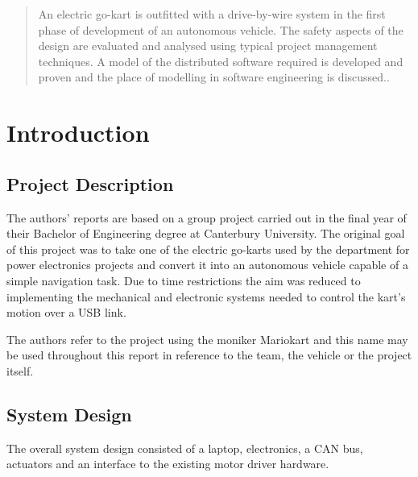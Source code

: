 
\begin{abstract}
An electric go-kart is outfitted with a drive-by-wire system in the first phase of development of 
an autonomous vehicle. The safety aspects of the design are evaluated and analysed  
using typical project management techniques. A model of the distributed software required is 
developed and proven and the place of modelling in software engineering is discussed..
\end{abstract}

\section{Introduction}

\subsection{Project Description}

The authors' reports are based on a group project carried out in the final year 
of their Bachelor of Engineering degree at Canterbury University. The original goal 
of this project was to take one of the electric go-karts used by the department for
power electronics projects and convert it into an autonomous vehicle capable of
a simple navigation task. Due to time restrictions the aim was reduced to implementing
the mechanical and electronic systems needed to control the kart's motion over a USB link.

The authors refer to the project using the moniker Mariokart and this name may be used 
throughout this report in reference to the team, the vehicle or the project itself.

\subsection{System Design}
The overall system design consisted of a laptop, electronics, a CAN bus, actuators and an interface to 
the existing motor driver  hardware.


